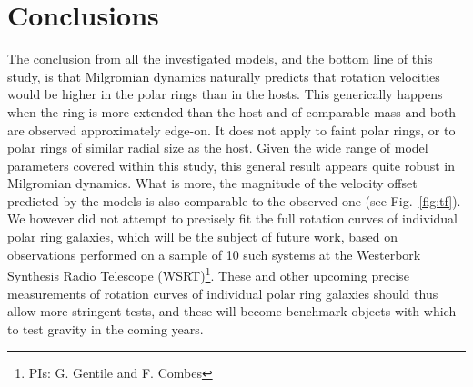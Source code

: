 \documentclass[useAMS,usenatbib]{mn2e}
\begin{document}
\section{Conclusions}\label{sect:conclusions}
The conclusion from all the investigated models, and the bottom line of this study, is that Milgromian dynamics naturally predicts that rotation velocities would be higher in the polar rings than in the hosts. This generically happens when the ring is more extended than the host and of comparable mass and both are observed approximately edge-on. It does not apply to faint polar rings, or to polar rings of similar radial size as the host.
Given the wide range of model parameters covered within this study, this general result appears quite robust in Milgromian dynamics.
What is more, the magnitude of the velocity offset predicted by the models is also comparable to the observed one (see Fig.~\ref{fig:tf}). We however did not attempt to precisely fit the full rotation curves of individual polar ring galaxies, which will be the subject of future work, based on observations performed on a sample of 10 such systems at the Westerbork Synthesis Radio Telescope (WSRT)\footnote{PIs: G. Gentile and F. Combes}.
These and other upcoming precise measurements of rotation curves of individual polar ring galaxies \citep[e.g. the future measurements announced in][]{Iodice2} should thus allow more stringent tests, and these will become benchmark objects with which to test gravity in the coming years.
\end{document}
